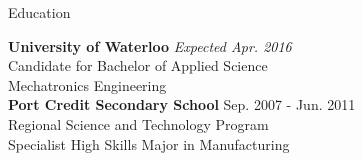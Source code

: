 \documentclass{resume} %
\begin{document}

\begin{rSection}{Education}

{\bf University of Waterloo} \hfill {\em Expected Apr. 2016} \\ 
Candidate for Bachelor of Applied Science \\
Mechatronics Engineering \\

{\bf Port Credit Secondary School} \hfill {Sep. 2007 - Jun. 2011} \\ 
Regional Science and Technology Program \\
Specialist High Skills Major in Manufacturing \\
\end{rSection}

\end{document}
